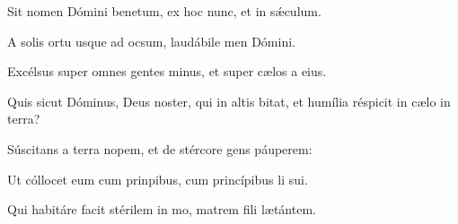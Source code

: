 \item {}

\item Sit nomen Dómini benetum,\psstar{} ex hoc nunc, et  in sǽculum.

\item A solis ortu usque ad ocsum,\psstar{} laudábile men Dómini.

\item Excélsus super omnes gentes minus,\psstar{} et super cælos a eius.

\item Quis sicut Dóminus, Deus noster, qui in altis bitat,\psstar{} et humília réspicit in cælo  in terra?

\item Súscitans a terra nopem,\psstar{} et de stércore gens páuperem:

\item Ut cóllocet eum cum prinpibus,\psstar{} cum princípibus li sui.

\item Qui habitáre facit stérilem in mo,\psstar{} matrem fili lætántem.
